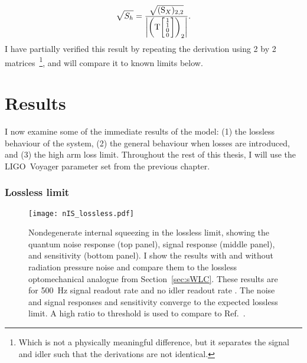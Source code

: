 \begin{equation}\label{eq:nIS_sigRO_sens}
\sqrt{S_h} = \frac{\sqrt{(\text{S}_X)_{2,2}}}{\abs{\left(\text{T}\begin{bsmallmatrix}1 \\1\\0\\0\end{bsmallmatrix}\right)_2}}.
\end{equation}
I have partially verified this result by repeating the derivation using 2 by 2 matrices~\footnote{Which is not a physically meaningful difference, but it separates the signal and idler such that the derivations are not identical.}, and will compare it to known limits below. %


\section{Results}
\label{sec:nIS_sigRO_results}


I now examine some of the immediate results of the model: (1) the lossless behaviour of the system, (2) the general behaviour when losses are introduced, and (3) the high arm loss limit.
Throughout the rest of this thesis, I will use the LIGO~Voyager parameter set from the previous chapter.


\subsubsection{Lossless limit}
\label{sec:nIS_lossless_limit}

\begin{figure}
    \centering
    \texttt{[image: nIS\_lossless.pdf]}
    \caption{ Nondegenerate internal squeezing in the lossless limit, showing the quantum noise response (top panel), signal response (middle panel), and sensitivity (bottom panel). I show the results with and without radiation pressure noise and compare them to the lossless optomechanical analogue from Section~\ref{sec:sWLC}. These results are for 500~Hz signal readout rate and no idler readout rate . The noise and signal responses and sensitivity converge to the expected lossless limit. A high ratio to threshold is used to compare to Ref.~\cite{liBroadbandSensitivityImprovement2020}.}
    \label{fig:nIS_lossless}
\end{figure}

